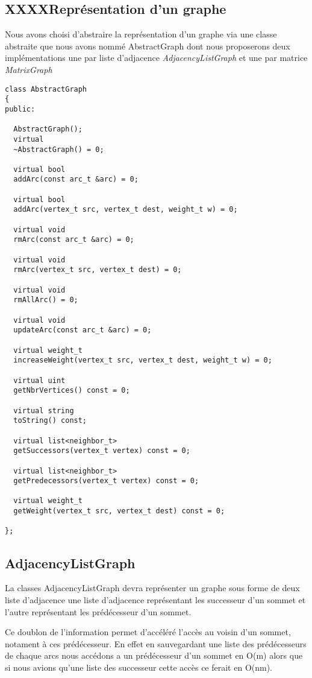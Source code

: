 \subsection{XXXXReprésentation d'un graphe}

Nous avons choisi d'abstraire la représentation d'un graphe via une
classe abstraite que nous avons nommé AbstractGraph dont nous proposerons
deux implémentations une par liste d'adjacence \emph{AdjacencyListGraph} 
et une par matrice \emph{MatrixGraph}

\begin{verbatim}
class AbstractGraph
{
public:

  AbstractGraph();
  virtual
  ~AbstractGraph() = 0;

  virtual bool
  addArc(const arc_t &arc) = 0;

  virtual bool
  addArc(vertex_t src, vertex_t dest, weight_t w) = 0;

  virtual void
  rmArc(const arc_t &arc) = 0;

  virtual void
  rmArc(vertex_t src, vertex_t dest) = 0;

  virtual void
  rmAllArc() = 0;

  virtual void
  updateArc(const arc_t &arc) = 0;

  virtual weight_t
  increaseWeight(vertex_t src, vertex_t dest, weight_t w) = 0;

  virtual uint
  getNbrVertices() const = 0;

  virtual string
  toString() const;

  virtual list<neighbor_t>
  getSuccessors(vertex_t vertex) const = 0;

  virtual list<neighbor_t>
  getPredecessors(vertex_t vertex) const = 0;

  virtual weight_t
  getWeight(vertex_t src, vertex_t dest) const = 0;

};

\end{verbatim}

\subsection{AdjacencyListGraph}

La classes AdjacencyListGraph devra représenter un graphe sous forme
de deux liste d'adjacence une liste d'adjacence représentant les 
successeur d'un sommet et l'autre représentant les prédécesseur d'un sommet.

Ce doublon de l'information permet d'accéléré l'accès au voisin d'un sommet, 
notament à ces prédécesseur. En effet en sauvegardant une liste des prédécesseurs
de chaque arcs nous accédons a un prédécesseur d'un sommet en O(m) alors 
que si nous avions qu'une liste des successeur cette accès ce ferait en 
O(nm).

